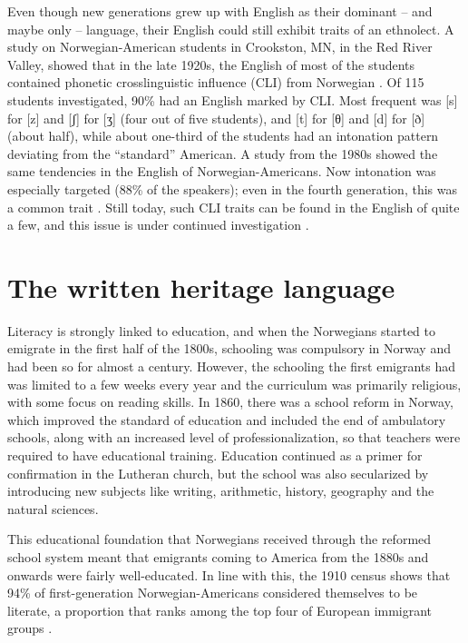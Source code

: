 \documentclass[output=paper]{langscibook}
\begin{document}
Even though new generations grew up with English as their dominant – and maybe only – language, their English could still exhibit traits of an ethnolect. A study on Norwegian\hyp American students in Crookston, MN, in the Red River Valley, showed that in the late 1920s, the English of most of the students contained phonetic crosslinguistic influence (CLI) from Norwegian \citep{Simley1930}. Of 115 students investigated, 90\% had an English marked by CLI. Most frequent was [s] for [z] and [ʃ] for [ʒ] (four out of five students), and [t] for [θ] and [d] for [ð] (about half), while about one-third of the students had an intonation pattern deviating from the “standard” American. A study from the 1980s showed the same tendencies in the English of Norwegian\hyp Americans. Now intonation was especially targeted (88\% of the speakers); even in the fourth generation, this was a common trait \citep{Moen1988}. Still today, such CLI traits can be found in the English of quite a few, and this issue is under continued investigation \citep{Moquininprogress}.  

\section{The written heritage language}\label{sec:hjelde:8}

Literacy is strongly linked to education, and when the Norwegians started to emigrate in the first half of the 1800s, schooling was compulsory in Norway and had been so for almost a century. However, the schooling the first emigrants had was limited to a few weeks every year and the curriculum was primarily religious, with some focus on reading skills. In 1860, there was a school reform in Norway, which improved the standard of education and included the end of ambulatory schools, along with an increased level of professionalization, so that teachers were required to have educational training. Education continued as a primer for confirmation in the Lutheran church, but the school was also secularized by introducing new subjects like writing, arithmetic, history, geography and the natural sciences. 

This educational foundation that Norwegians received through the reformed school system meant that emigrants coming to America from the 1880s and onwards were fairly well-educated. In line with this, the 1910 census shows that 94\% of first-generation Norwegian\hyp Americans considered themselves to be literate, a proportion that ranks among the top four of European immigrant groups \citep[385]{Labov1998}.
\end{document}

